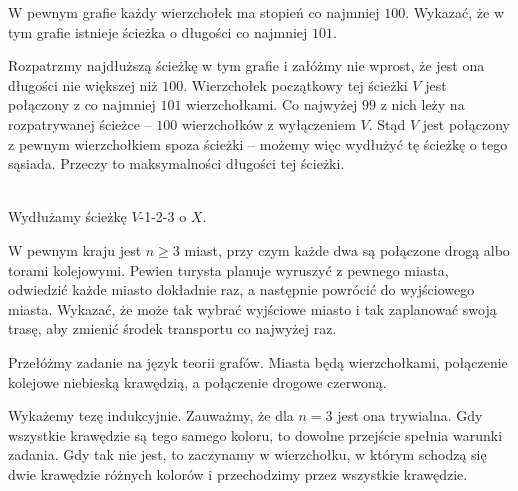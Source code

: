 \newpage
{}

\begin{problem}{1}
	W pewnym grafie każdy wierzchołek ma stopień co najmniej $100$. Wykazać, że w tym grafie istnieje ścieżka o długości co najmniej $101$.
\end{problem}

\noindent
Rozpatrzmy najdłuższą ścieżkę w tym grafie i załóżmy nie wprost, że jest ona długości nie większej niż $100$. Wierzchołek początkowy tej ścieżki $V$ jest połączony z co najmniej $101$ wierzchołkami. Co najwyżej $99$ z nich leży na rozpatrywanej ścieżce -- $100$ wierzchołków z wyłączeniem $V$. Stąd $V$ jest połączony z pewnym wierzchołkiem spoza ścieżki – możemy więc wydłużyć tę ścieżkę o tego sąsiada. Przeczy to maksymalności długości tej ścieżki.

\begin{center}
    \\
    Wydłużamy ścieżkę $V$-1-2-3 o $X$.\\
\end{center}


\begin{problem}{2}
	W pewnym kraju jest $n \geqslant{3}$ miast, przy czym każde dwa są połączone drogą albo torami kolejowymi. Pewien turysta planuje wyruszyć z pewnego miasta, odwiedzić każde miasto dokładnie raz, a następnie powrócić do wyjściowego miasta. Wykazać, że może tak wybrać wyjściowe miasto i tak zaplanować swoją trasę, aby zmienić środek transportu co najwyżej raz.
\end{problem}

\noindent
Przełóżmy zadanie na język teorii grafów. Miasta będą wierzchołkami, połączenie kolejowe niebieską krawędzią, a połączenie drogowe czerwoną.

\vspace{5px}

\noindent
Wykażemy tezę indukcyjnie. Zauważmy, że dla $n = 3$ jest ona trywialna. Gdy wszystkie krawędzie są tego samego koloru, to dowolne przejście spełnia warunki zadania. Gdy tak nie jest, to zaczynamy w wierzchołku, w którym schodzą się dwie krawędzie różnych kolorów i przechodzimy przez wszystkie krawędzie.

